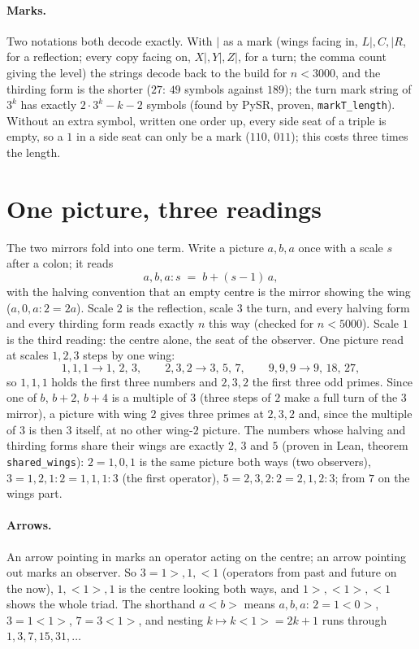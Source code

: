 \documentclass[11pt]{article}
\begin{document}
\paragraph{Marks.} Two notations both decode exactly. With $|$ as a mark (wings facing in, $L|,C,|R$, for a reflection; every copy facing on, $X|,Y|,Z|$, for a turn; the comma count giving the level) the strings decode back to the build for $n<3000$, and the thirding form is the shorter ($27$: $49$ symbols against $189$); the turn mark string of $3^k$ has exactly $2\cdot3^k-k-2$ symbols (found by PySR, proven, \texttt{markT\_length}). Without an extra symbol, written one order up, every side seat of a triple is empty, so a $1$ in a side seat can only be a mark ($110$, $011$); this costs three times the length.

\section{One picture, three readings}
The two mirrors fold into one term. Write a picture $a,b,a$ once with a scale $s$ after a colon; it reads
\[ a,b,a\!:\!s \;=\; b + (s-1)\,a, \]
with the halving convention that an empty centre is the mirror showing the wing ($a,0,a\!:\!2 = 2a$). Scale $2$ is the reflection, scale $3$ the turn, and every halving form and every thirding form reads exactly $n$ this way (checked for $n<5000$). Scale $1$ is the third reading: the centre alone, the seat of the observer. One picture read at scales $1,2,3$ steps by one wing:
\[ 1,1,1 \to 1,\,2,\,3,\qquad 2,3,2 \to 3,\,5,\,7,\qquad 9,9,9 \to 9,\,18,\,27, \]
so $1,1,1$ holds the first three numbers and $2,3,2$ the first three odd primes. Since one of $b$, $b+2$, $b+4$ is a multiple of $3$ (three steps of $2$ make a full turn of the $3$ mirror), a picture with wing $2$ gives three primes at $2,3,2$ and, since the multiple of $3$ is then $3$ itself, at no other wing-$2$ picture. The numbers whose halving and thirding forms share their wings are exactly $2$, $3$ and $5$ (proven in Lean, theorem \texttt{shared\_wings}): $2 = 1,0,1$ is the same picture both ways (two observers), $3 = 1,2,1\!:\!2 = 1,1,1\!:\!3$ (the first operator), $5 = 2,3,2\!:\!2 = 2,1,2\!:\!3$; from $7$ on the wings part.

\paragraph{Arrows.} An arrow pointing in marks an operator acting on the centre; an arrow pointing out marks an observer. So $3 = 1{>},1,{<}1$ (operators from past and future on the now), $1,{<}1{>},1$ is the centre looking both ways, and $1{>},{<}1{>},{<}1$ shows the whole triad. The shorthand $a{<}b{>}$ means $a,b,a$: $2 = 1{<}0{>}$, $3 = 1{<}1{>}$, $7 = 3{<}1{>}$, and nesting $k \mapsto k{<}1{>} = 2k+1$ runs through $1, 3, 7, 15, 31, \dots$
\end{document}
